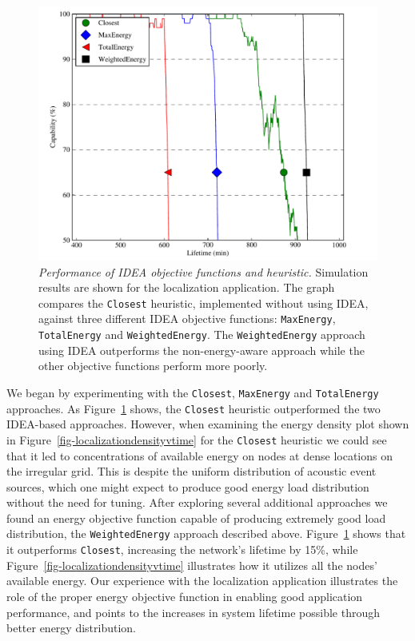 \documentclass{sig-alternate}
\begin{document}
\begin{figure}[t]
\begin{center}
\includegraphics[width=\hsize]{./figs/graph_capability_vs_time1210_2100.pdf}
\end{center}

\caption{\textit{Performance of IDEA objective functions and heuristic.}
Simulation results are shown for the localization application. The graph
compares the \texttt{Closest} heuristic, implemented without using IDEA,
against three different IDEA objective functions: \texttt{MaxEnergy},
\texttt{TotalEnergy} and \texttt{WeightedEnergy}. The \texttt{WeightedEnergy}
approach using IDEA outperforms the non-energy-aware approach while the other
objective functions perform more poorly.}

\label{fig-ideavsheuristics}
\end{figure}

\vfill\eject

We began by experimenting with the \texttt{Closest}, \texttt{MaxEnergy} and
\texttt{TotalEnergy} approaches. As Figure~\ref{fig-ideavsheuristics} shows,
the \texttt{Closest} heuristic outperformed the two IDEA-based approaches.
However, when examining the energy density plot shown in
Figure~\ref{fig-localizationdensityvtime} for the \texttt{Closest} heuristic
we could see that it led to concentrations of available energy on nodes at
dense locations on the irregular grid. This is despite the uniform
distribution of acoustic event sources, which one might expect to produce
good energy load distribution without the need for tuning. After exploring
several additional approaches we found an energy objective function capable
of producing extremely good load distribution, the \texttt{WeightedEnergy}
approach described above. Figure~\ref{fig-ideavsheuristics} shows that it
outperforms \texttt{Closest}, increasing the network's lifetime by 15\%,
while Figure~\ref{fig-localizationdensityvtime} illustrates how it utilizes
all the nodes' available energy. Our experience with the localization
application illustrates the role of the proper energy objective function in
enabling good application performance, and points to the increases in system
lifetime possible through better energy distribution. 
\end{document}
